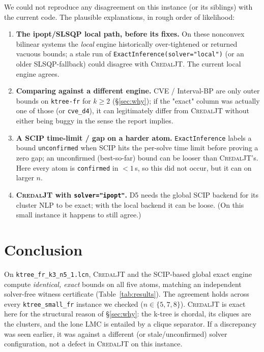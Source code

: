\documentclass[11pt]{article}
\begin{document}
We could not reproduce any disagreement on this instance (or its siblings) with
the current code. The plausible explanations, in rough order of likelihood:
\begin{enumerate}
\item \textbf{The ipopt/SLSQP local path, before its fixes.} On these nonconvex
bilinear systems the \emph{local} engine historically over-tightened or returned
vacuous bounds; a stale run of \texttt{ExactInference(solver="local")} (or an
older SLSQP-fallback) could disagree with \textsc{CredalJT}. The current local
engine agrees.
\item \textbf{Comparing against a different engine.} CVE / Interval-BP are only
outer bounds on \texttt{ktree-fr} for $k\ge 2$ (\S\ref{sec:why}); if the "exact"
column was actually one of those (or \texttt{cve\_d4}), it can legitimately
differ from \textsc{CredalJT} without either being buggy in the sense the report
implies.
\item \textbf{A SCIP time-limit / gap on a harder atom.} \texttt{ExactInference}
labels a bound \texttt{unconfirmed} when SCIP hits the per-solve time limit
before proving a zero gap; an unconfirmed (best-so-far) bound can be looser than
\textsc{CredalJT}'s. Here every atom is \texttt{confirmed} in $<1$\,s, so this
did not occur, but it can on larger $n$.
\item \textbf{\textsc{CredalJT} with \texttt{solver="ipopt"}.} D5 needs the
global SCIP backend for its cluster NLP to be exact; with the local backend it
can be loose. (On this small instance it happens to still agree.)
\end{enumerate}

\section{Conclusion}

On \texttt{ktree\_fr\_k3\_n5\_1.lcn}, \textsc{CredalJT} and the SCIP-based global
exact engine compute \emph{identical, exact} bounds on all five atoms, matching
an independent solver-free witness certificate (Table~\ref{tab:results}). The
agreement holds across every \texttt{ktree\_small\_fr} instance we checked
($n\in\{5,7,8\}$). \textsc{CredalJT} is exact here for the structural reason of
\S\ref{sec:why}: the k-tree is chordal, its cliques are the clusters, and the
lone LMC is entailed by a clique separator. If a discrepancy was seen earlier,
it was against a different (or stale/unconfirmed) solver configuration, not a
defect in \textsc{CredalJT} on this instance.
\end{document}

